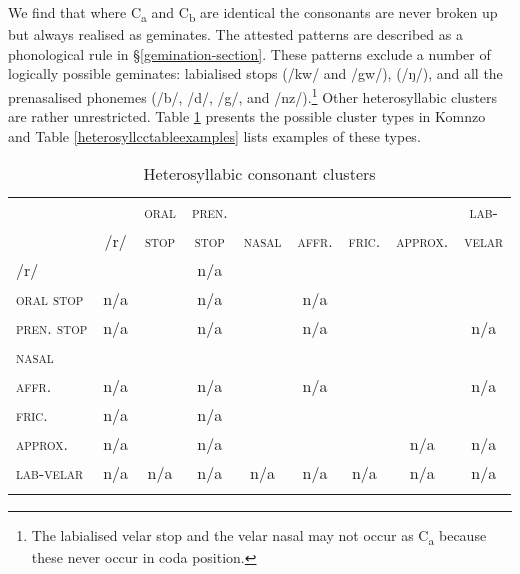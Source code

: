 We find that where C\textsubscript{a} and C\textsubscript{b} are identical the consonants are never broken up but always realised as geminates. The attested  patterns are described as a phonological rule in \S{}\ref{gemination-section}. These patterns exclude a number of logically possible geminates: labialised  stops (/kw/ and /gw/),   (/ŋ/), and all the prenasalised phonemes (/b/, /d/, /g/, and /nz/).\footnote{The labialised velar stop and the velar nasal may not occur as C\textsubscript{a} because these never occur in coda position.} Other heterosyllabic clusters are rather unrestricted. Table \ref{heterosyllcctable} presents the possible cluster types in Komnzo and Table \ref{heterosyllcctableexamples} lists examples of these types.

\begin{table}
\caption{Heterosyllabic consonant clusters}
\label{heterosyllcctable}
	\begin{tabular}{lcccccccc}
		\lsptoprule
		&&\textsc{oral}&\textsc{pren.}&&&&&\textsc{lab-}\\
		& /r/ & \textsc{stop} & \textsc{stop}\footnotemark & \textsc{nasal} & \textsc{affr.} & \textsc{fric.} & \textsc{approx.} & \textsc{velar}\\ \midrule
		/r/ & \checkmark & \checkmark & n/a & \checkmark & \checkmark & \checkmark & \checkmark  & \checkmark\\%
		\textsc{oral stop} & n/a & \checkmark & n/a & \checkmark & n/a & \checkmark & \checkmark  & \checkmark\\%
		\textsc{pren. stop} & n/a & \checkmark & n/a & \checkmark & n/a & \checkmark & \checkmark  & n/a\\%
		\textsc{nasal} & \checkmark & \checkmark & \checkmark & \checkmark & \checkmark & \checkmark & \checkmark  & \checkmark\\%
		\textsc{affr.} & n/a & \checkmark & n/a & \checkmark & n/a & \checkmark & \checkmark & n/a\\%
		\textsc{fric.} &  n/a & \checkmark & n/a & \checkmark & \checkmark & \checkmark & \checkmark  & \checkmark\\%
		\textsc{approx.} &  n/a & \checkmark & n/a & \checkmark & \checkmark & \checkmark & n/a  & n/a\\%
		\textsc{lab-velar} & n/a & n/a& n/a& n/a& n/a& n/a& n/a& n/a\\%
		\lspbottomrule
	\end{tabular}
\end{table}%
